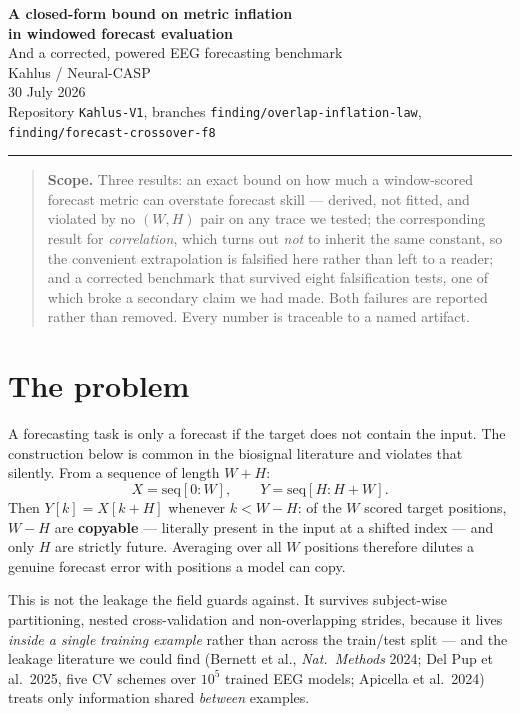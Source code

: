 \documentclass[10pt]{article}
\begin{document}
\begin{center}
{\LARGE\bfseries A closed-form bound on metric inflation\\[2pt]
in windowed forecast evaluation}\\[7pt]
{\large And a corrected, powered EEG forecasting benchmark}\\[10pt]
{\normalsize Kahlus / Neural-CASP}\\[5pt]
{\small 30 July 2026}\\[3pt]
{\small Repository \texttt{Kahlus-V1}, branches
\texttt{finding/overlap-inflation-law}, \texttt{finding/forecast-crossover-f8}}
\end{center}

\vspace{2pt}\hrule\vspace{5pt}

\begin{quote}\small
\textbf{Scope.} Three results: an exact bound on how much a window-scored
forecast metric can overstate forecast skill --- derived, not fitted, and violated
by no $(W,H)$ pair on any trace we tested; the corresponding result for
\emph{correlation}, which turns out \emph{not} to inherit the same constant, so
the convenient extrapolation is falsified here rather than left to a reader; and
a corrected benchmark that survived eight falsification tests, one of which
broke a secondary claim we had made. Both failures are reported rather than
removed. Every number is traceable to a named artifact.
\end{quote}

\vspace{2pt}

\section{The problem}

A forecasting task is only a forecast if the target does not contain the input.
The construction below is common in the biosignal literature and violates that
silently. From a sequence of length $W{+}H$:
\[
X = \mathrm{seq}[0\!:\!W], \qquad Y = \mathrm{seq}[H\!:\!H{+}W].
\]
Then $Y[k] = X[k{+}H]$ whenever $k < W{-}H$: of the $W$ scored target positions,
$W{-}H$ are \textbf{copyable} --- literally present in the input at a shifted index
--- and only $H$ are strictly future. Averaging over all $W$ positions therefore
dilutes a genuine forecast error with positions a model can copy.

This is not the leakage the field guards against. It survives subject-wise
partitioning, nested cross-validation and non-overlapping strides, because it lives
\emph{inside a single training example} rather than across the train/test split ---
and the leakage literature we could find (Bernett et al., \textit{Nat.\ Methods}
2024; Del Pup et al.\ 2025, five CV schemes over $10^5$ trained EEG models;
Apicella et al.\ 2024) treats only information shared \emph{between} examples.
\end{document}
